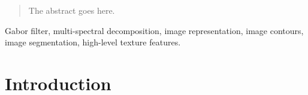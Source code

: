 \documentclass[journal]{IEEEtran}
\begin{document}
% 






\maketitle

\begin{abstract}
The abstract goes here.
\end{abstract}

\begin{IEEEkeywords}
Gabor filter, multi-spectral decomposition, image representation, image contours, image segmentation, high-level texture features.
\end{IEEEkeywords}


%
\IEEEpeerreviewmaketitle



\section{Introduction}
\end{document}
